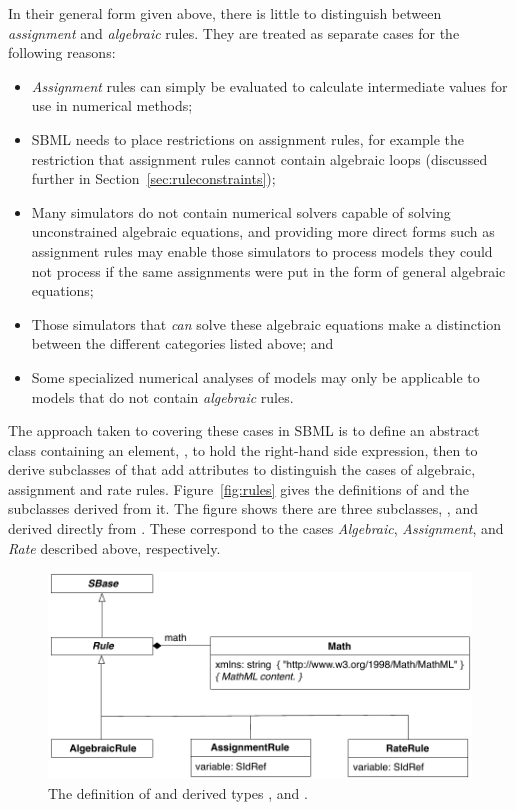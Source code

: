In their general form given above, there is little to distinguish
between \emph{assignment} and \emph{algebraic} rules.  They are
treated as separate cases for the following reasons:
\begin{itemize}
  
\item \emph{Assignment} rules can simply be evaluated to calculate
  intermediate values for use in numerical methods;
  
\item SBML needs to place restrictions on assignment rules, for
  example the restriction that assignment rules cannot contain
  algebraic loops (discussed further in
  Section~\ref{sec:ruleconstraints});

\item Many simulators do not contain numerical solvers capable of
  solving unconstrained algebraic equations, and providing more
  direct forms such as assignment rules may enable those
  simulators to process models they could not process if the same
  assignments were put in the form of general algebraic equations;
  
\item Those simulators that \emph{can} solve these algebraic
  equations make a distinction between the different categories
  listed above; and
  
\item Some specialized numerical analyses of models may only be
  applicable to models that do not contain \emph{algebraic} rules.

\end{itemize}

The approach taken to covering these cases in SBML is to define an
abstract \Rule class containing an element,
, to hold the right-hand side expression, then to
derive subclasses of \Rule that add attributes to
distinguish the cases of algebraic, assignment and rate rules.
Figure~\vref{fig:rules} gives the definitions of \Rule and the
subclasses derived from it.  The figure shows there are three
subclasses, \AlgebraicRule, \AssignmentRule and \RateRule derived
directly from \Rule. These correspond to the cases
\emph{Algebraic}, \emph{Assignment}, and \emph{Rate} described
above, respectively.

\begin{figure}[htb]
  \centering
  \includegraphics[scale=0.8]{figs/rule-uml}
  \caption{The definition of \Rule and derived types
      \AlgebraicRule, \AssignmentRule and \RateRule.}
  \label{fig:rules}
\end{figure}



